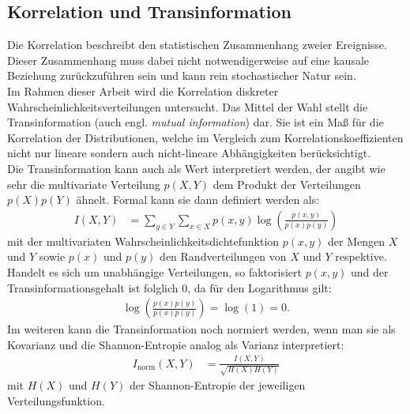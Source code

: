 \subsection{Korrelation und Transinformation}
Die Korrelation beschreibt den statistischen Zusammenhang zweier Ereignisse. Dieser Zusammenhang muss dabei nicht notwendigerweise auf eine kausale Beziehung zurückzuführen sein und kann rein stochastischer Natur sein.\\
Im Rahmen dieser Arbeit wird die Korrelation diskreter Wahrscheinlichkeitsverteilungen untersucht. Das Mittel der Wahl stellt die Transinformation (auch engl. \emph{mutual information}) dar. Sie ist ein Maß für die Korrelation der Distributionen, welche im Vergleich zum Korrelationskoeffizienten nicht nur lineare sondern auch nicht-lineare Abhängigkeiten berücksichtigt\cite{mi_corr}.\\
Die Transinformation kann auch als Wert interpretiert werden, der angibt wie sehr die multivariate Verteilung $p(X, Y)$ dem Produkt der Verteilungen $p(X) p(Y)$ ähnelt. Formal kann sie dann definiert werden als:
\begin{align}
	I(X,Y) &= \sum_{y\in Y}\sum_{x\in X}p(x,y)\log(\frac{p(x,y)}{p(x)p(y)})
\end{align}
mit der multivariaten Wahrscheinlichkeitsdichtefunktion $p(x, y)$ der Mengen $X$ und $Y$ sowie $p(x)$ und $p(y)$ den Randverteilungen von $X$ und $Y$ respektive. Handelt es sich um unabhängige Verteilungen, so faktorisiert $p(x, y)$ und der Transinformationsgehalt ist folglich $\num{0}$, da für den Logarithmus gilt:
\begin{align}
	\log(\frac{p(x)p(y)}{p(x)p(y)}) = \log(1) = 0.
\end{align}
Im weiteren kann die Transinformation noch normiert werden, wenn man sie als Kovarianz und die Shannon-Entropie analog als Varianz interpretiert\cite{mi_norm}:
\begin{align}
	I_{\mathrm{norm}}(X,Y) &= \frac{I(X,Y)}{\sqrt{H(X)H(Y)}}
\end{align}
mit $H(X)$ und $H(Y)$ der Shannon-Entropie der jeweiligen Verteilungsfunktion.